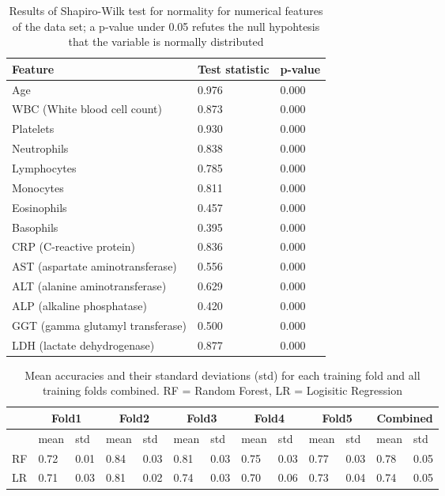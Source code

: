 \begin{table}
\begin{tabular}{lll}
Feature                          & Test statistic & p-value \\ \hline
Age                              & 0.976          & 0.000   \\
WBC (White blood cell count)     & 0.873          & 0.000   \\
Platelets                        & 0.930          & 0.000   \\
Neutrophils                      & 0.838          & 0.000   \\
Lymphocytes                      & 0.785          & 0.000   \\
Monocytes                        & 0.811          & 0.000   \\
Eosinophils                      & 0.457          & 0.000   \\
Basophils                        & 0.395          & 0.000   \\
CRP (C-reactive protein)         & 0.836          & 0.000   \\
AST (aspartate aminotransferase) & 0.556          & 0.000   \\
ALT (alanine aminotransferase)   & 0.629          & 0.000   \\
ALP (alkaline phosphatase)       & 0.420          & 0.000   \\
GGT (gamma glutamyl transferase) & 0.500          & 0.000   \\
LDH (lactate dehydrogenase)      & 0.877          & 0.000  
\end{tabular}
\caption{Results of Shapiro-Wilk test for normality for numerical features of 
the data set; a p-value under 0.05 refutes the null hypohtesis that the 
variable is normally distributed}
\label{tab:shapiro-wilk}
\end{table}

\begin{table}
\centering
\begin{tabular}{lllllllllllll}
 &
  \multicolumn{2}{c}{Fold1} &
  \multicolumn{2}{c}{Fold2} &
  \multicolumn{2}{c}{Fold3} &
  \multicolumn{2}{c}{Fold4} &
  \multicolumn{2}{c}{Fold5} &
  \multicolumn{2}{c}{Combined} \\ \hline
                    & mean & std  & mean & std  & mean & std  & mean & std  & 
mean & std  & mean & std  \\ \hline
RF       & 0.72 & 0.01 & 0.84 & 0.03 & 0.81 & 0.03 & 0.75 & 0.03 & 
0.77 & 0.03 & 0.78 & 0.05 \\
LR & 0.71 & 0.03 & 0.81 & 0.02 & 0.74 & 0.03 & 0.70 & 0.06 & 
0.73 & 0.04 & 0.74 & 0.05
\end{tabular}
\caption{Mean accuracies and their standard deviations (std) 
for each training fold and all training folds combined. RF = Random Forest, 
LR = Logisitic Regression }
\label{tab:training-acc}
\end{table}

